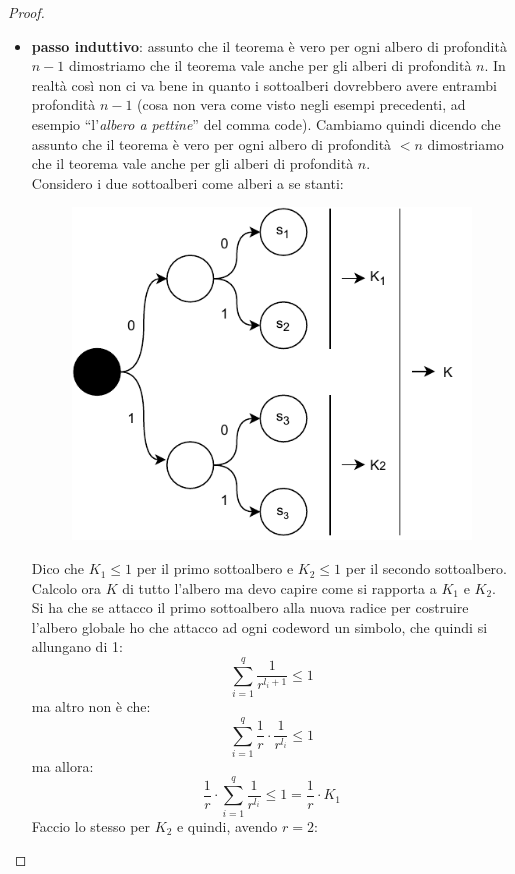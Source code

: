 \documentclass[a4paper,12pt, oneside]{book}
\begin{document}
\begin{proof}
\begin{itemize}
    \item \textbf{passo induttivo}: assunto che il teorema è vero per ogni
    albero di profondità $n-1$ dimostriamo che il teorema vale anche per gli
    alberi di profondità $n$. In realtà così non ci va bene in quanto i
    sottoalberi dovrebbero avere entrambi profondità $n-1$ (cosa non vera come
    visto negli esempi precedenti, ad esempio ``l'\textit{albero a pettine}''
    del comma code). Cambiamo quindi dicendo che  assunto che il teorema è vero
    per ogni albero di profondità $<n$ dimostriamo che il teorema vale anche per
    gli alberi di profondità $n$.\\
    Considero i due sottoalberi come alberi a se stanti:
    \begin{figure}[H]
      \centering
      \includegraphics[scale = 0.7]{img/ct7.pdf}
    \end{figure}
    Dico che $K_1\leq 1$ per il primo sottoalbero e $K_2\leq 1$ per il secondo
    sottoalbero. \\
    Calcolo ora $K$ di tutto l'albero ma devo capire come si rapporta a $K_1$ e
    $K_2$. Si ha che se attacco il primo sottoalbero alla nuova radice per
    costruire l'albero globale ho che attacco ad ogni codeword un simbolo, che
    quindi si allungano di 1:
    \[\sum_{i=1}^q\frac{1}{r^{l_i+1}}\leq 1\]
    ma altro non è che:
    \[\sum_{i=1}^q\frac{1}{r}\cdot\frac{1}{r^{l_i}}\leq 1\]
    ma allora:
    \[\frac{1}{r}\cdot\sum_{i=1}^q\frac{1}{r^{l_i}}\leq 1=\frac{1}{r}\cdot K_1\]
    Faccio lo stesso per $K_2$ e quindi, avendo $r=2$:

\end{itemize}
\end{proof}
\end{document}
